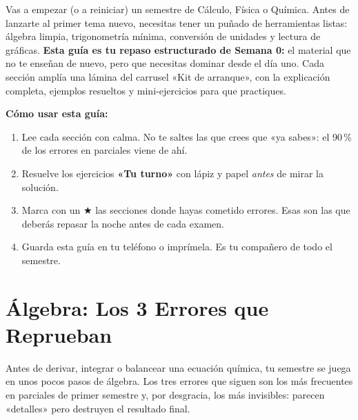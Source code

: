 \documentclass[12pt, letterpaper]{article}
\begin{document}

\vspace{6pt}
\begin{cuadroinfo}
  \small
  Vas a empezar (o a reiniciar) un semestre de Cálculo, Física o Química. Antes de lanzarte al primer tema nuevo, necesitas tener un puñado de herramientas listas: álgebra limpia, trigonometría mínima, conversión de unidades y lectura de gráficas. \textbf{Esta guía es tu repaso estructurado de Semana 0:} el material que no te enseñan de nuevo, pero que necesitas dominar desde el día uno. Cada sección amplía una lámina del carrusel «Kit de arranque», con la explicación completa, ejemplos resueltos y mini-ejercicios para que practiques.
\end{cuadroinfo}

\begin{cuadroextra}
  \small
  \textbf{Cómo usar esta guía:}
  \begin{enumerate}[leftmargin=*]
    \item Lee cada sección con calma. No te saltes las que crees que «ya sabes»: el 90\,\% de los errores en parciales viene de ahí.
    \item Resuelve los ejercicios \textbf{«Tu turno»} con lápiz y papel \emph{antes} de mirar la solución.
    \item Marca con un $\bigstar$ las secciones donde hayas cometido errores. Esas son las que deberás repasar la noche antes de cada examen.
    \item Guarda esta guía en tu teléfono o imprímela. Es tu compañero de todo el semestre.
  \end{enumerate}
\end{cuadroextra}

\section{Álgebra: Los 3 Errores que Reprueban}

Antes de derivar, integrar o balancear una ecuación química, tu semestre se juega en unos pocos pasos de álgebra. Los tres errores que siguen son los más frecuentes en parciales de primer semestre y, por desgracia, los más invisibles: parecen «detalles» pero destruyen el resultado final.
\end{document}
